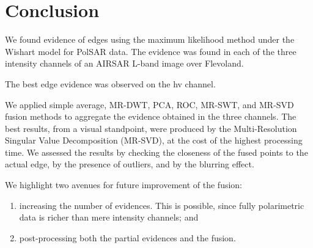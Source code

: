 \documentclass[journal]{IEEEtran}
\begin{document}
\section{Conclusion}\label{sec_06}

We found evidence of edges using the maximum likelihood method under the Wishart model for PolSAR data. 
The evidence was found in each of the three intensity channels of an AIRSAR L-band image over Flevoland.

The best edge evidence was observed on the hv channel.

We applied simple average, MR-DWT, PCA, ROC, MR-SWT, and MR-SVD fusion methods to aggregate the evidence obtained in the three channels.
The best results, from a visual standpoint, were produced by the Multi-Resolution Singular Value Decomposition (MR-SVD), at the cost of the highest processing time.
We assessed the results by checking the closeness of the fused points to the actual edge, by the presence of outliers, and by the blurring effect.

We highlight two avenues for future improvement of the fusion:
\begin{enumerate}
	\item increasing the number of evidences.
	This is possible, since fully polarimetric data is richer than mere intensity channels; and
	\item post-processing both the partial evidences and the fusion.
\end{enumerate}



\end{document}
